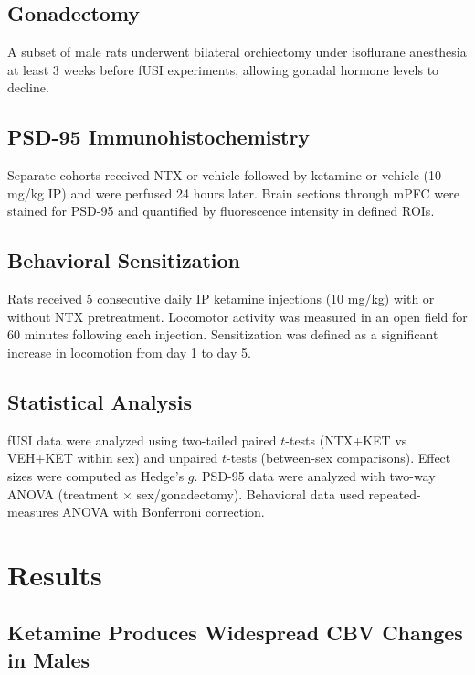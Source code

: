 \documentclass[11pt]{article}
\begin{document}
\subsection{Gonadectomy}

A subset of male rats underwent bilateral orchiectomy under isoflurane anesthesia at least 3 weeks before fUSI experiments, allowing gonadal hormone levels to decline.

\subsection{PSD-95 Immunohistochemistry}

Separate cohorts received NTX or vehicle followed by ketamine or vehicle (10 mg/kg IP) and were perfused 24 hours later. Brain sections through mPFC were stained for PSD-95 and quantified by fluorescence intensity in defined ROIs.

\subsection{Behavioral Sensitization}

Rats received 5 consecutive daily IP ketamine injections (10 mg/kg) with or without NTX pretreatment. Locomotor activity was measured in an open field for 60 minutes following each injection. Sensitization was defined as a significant increase in locomotion from day 1 to day 5.

\subsection{Statistical Analysis}

fUSI data were analyzed using two-tailed paired $t$-tests (NTX+KET vs VEH+KET within sex) and unpaired $t$-tests (between-sex comparisons). Effect sizes were computed as Hedge's $g$. PSD-95 data were analyzed with two-way ANOVA (treatment $\times$ sex/gonadectomy). Behavioral data used repeated-measures ANOVA with Bonferroni correction.

\section{Results}

\subsection{Ketamine Produces Widespread CBV Changes in Males}
\end{document}
